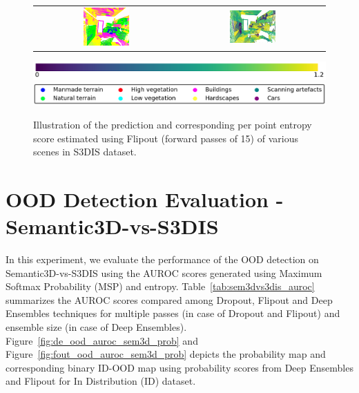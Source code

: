\begin{figure}[h!]
\begin{tabular}{cc}
            \includegraphics[width=0.33\textwidth, height=0.18\textheight]{images/seg_output/s3dis_DE/office_42.pdf}& 
            \includegraphics[width=0.33\textwidth, height=0.18\textheight]{images/seg_output/flipout/ent_fout_s3dis_4.pdf}\\
        \end{tabular}
        \includegraphics[scale=0.45]{images/ent_legend.pdf}
        \includegraphics[scale=0.45]{images/legend.png}
        \caption{Illustration of the prediction and corresponding per point entropy score estimated using Flipout (forward passes of 15) of various scenes in S3DIS dataset.}
        \label{fig:fout_s3dis_entmap}
    \end{figure}
    \FloatBarrier
    \section{OOD Detection Evaluation - Semantic3D-vs-S3DIS}
    In this experiment, we evaluate the performance of the OOD detection on Semantic3D-vs-S3DIS using the AUROC scores generated using Maximum Softmax Probability (MSP) and entropy.
    Table~\ref{tab:sem3dvs3dis_auroc} summarizes the AUROC scores compared among Dropout, Flipout and Deep Ensembles techniques for multiple passes (in case of Dropout and Flipout) and ensemble size (in case of Deep Ensembles).
    Figure~\ref{fig:de_ood_auroc_sem3d_prob} and Figure~\ref{fig:fout_ood_auroc_sem3d_prob} depicts the probability map and corresponding binary ID-OOD map using probability scores from Deep Ensembles and Flipout for In Distribution (ID) dataset.
    
